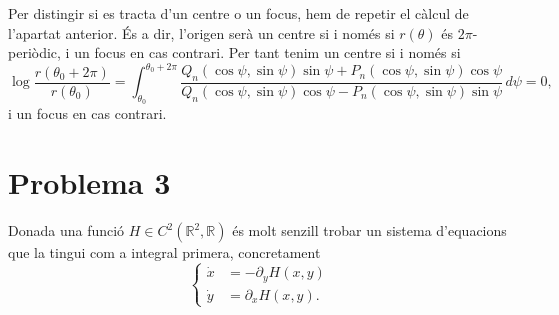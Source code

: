 \documentclass[12pt]{article}
\newcommand{\R}{\mathbb{R}}
\begin{document}
\begin{enumerate}[label=(\roman*), font=\bfseries \sffamily, wide, labelwidth=!, labelindent=0pt]
		Per distingir si es tracta d'un centre o un focus, hem de repetir el càlcul de l'apartat anterior. És a dir, l'origen serà un centre si i només si \( r(\theta) \) és \( 2\pi \)-periòdic, i un focus en cas contrari. Per tant tenim un centre si i només si
		\begin{equation*}
			\log{\frac{r(\theta_0 + 2\pi)}{r(\theta_0)}} = \int_{\theta_0}^{\theta_0 + 2\pi} \frac{Q_n(\cos{\psi}, \sin{\psi}) \sin{\psi} + P_n(\cos{\psi}, \sin{\psi}) \cos{\psi}}{Q_n(\cos{\psi}, \sin{\psi}) \cos{\psi} - P_n(\cos{\psi}, \sin{\psi}) \sin{\psi}} \, d\psi = 0,
		\end{equation*}
	i un focus en cas contrari. 	

\end{enumerate}

\section*{Problema 3}
Donada una funció \( H \in C^2(\R^2, \R) \) és molt senzill trobar un sistema d'equacions que la tingui com a integral primera, concretament
\begin{equation*}
	\left\{ 
		\begin{aligned}
			\dot{x} & = -\partial_y H(x,y) \\
			\dot{y} & = \partial_x H(x,y).
		\end{aligned} 
	\right. 
\end{equation*}
\end{document}
